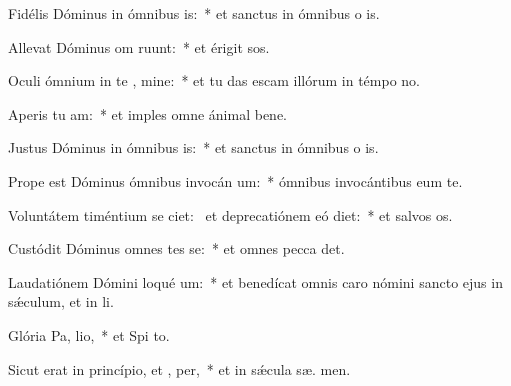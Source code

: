 \item Fidélis Dóminus in ómnibus  is:~* et sanctus in ómnibus o is.
\item Allevat Dóminus om  ruunt:~* et érigit  sos.
\item Oculi ómnium in te , mine:~* et tu das escam illórum in témpo no.
\item Aperis tu  am:~* et imples omne ánimal bene.
\item Justus Dóminus in ómnibus  is:~* et sanctus in ómnibus o is.
\item Prope est Dóminus ómnibus invocán um:~* ómnibus invocántibus eum  te.
\item Voluntátem timéntium se ciet:~\pscross{} et deprecatiónem eó diet:~* et salvos  os.
\item Custódit Dóminus omnes tes se:~* et omnes pecca det.
\item Laudatiónem Dómini loqué  um:~* et benedícat omnis caro nómini sancto ejus in sǽculum, et in  li.
\item Glória Pa,  lio,~* et Spi to.
\item Sicut erat in princípio, et ,  per,~* et in sǽcula sæ. men.
